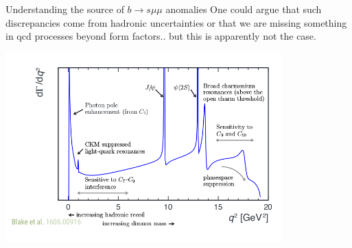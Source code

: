 \documentclass[9pt,usenames,dvipsnames]{beamer}
\begin{document}
	\begin{frame}{Understanding the source of $ b\to s \mu \mu$ anomalies }
One could argue that such discrepancies come from hadronic uncertainties or that we are missing something in qcd processes beyond form factors.. but this is apparently not the case.\\
	\begin{center}
		\includegraphics[width= 0.8\textwidth]{./assets/q2_bkll} 
	\end{center}
	\end{frame}
\end{document}
